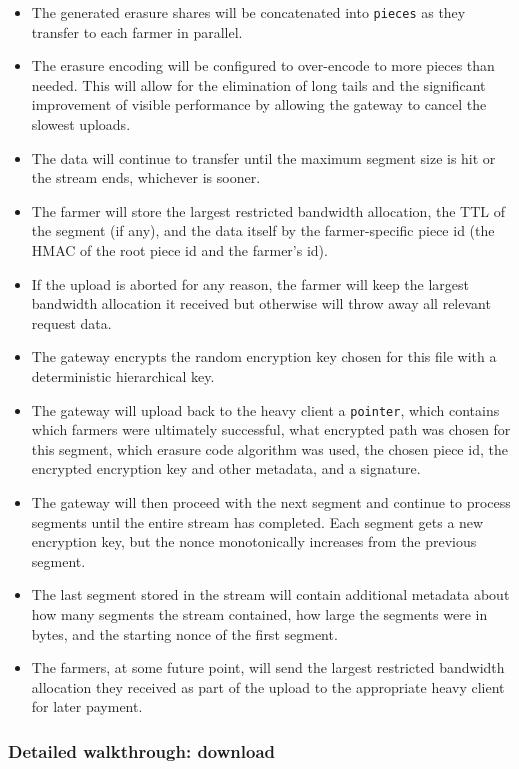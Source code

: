 \documentclass[a4paper,10pt]{article} \usepackage[utf8]{inputenc}
\newcommand{\x}[1]{{\tt #1}} \newcommand{\code}[1]{{\tt #1}}
\begin{document}
\begin{itemize}
\item The generated erasure shares will be concatenated into \x{pieces} as they
  transfer to each farmer in parallel.
\item The erasure encoding will be configured to over-encode to more pieces
  than needed. This will allow for the elimination of long tails and the
  significant improvement of visible performance by allowing the gateway to
  cancel the slowest uploads.
\item The data will continue to transfer until the maximum segment size is hit
  or the stream ends, whichever is sooner.
\item The farmer will store the largest restricted bandwidth allocation, the
  TTL of the segment (if any), and the data itself by the farmer-specific piece
  id (the HMAC of the root piece id and the farmer's id).
\item If the upload is aborted for any reason, the farmer will keep the
  largest bandwidth allocation it received but otherwise will throw away all
  relevant request data.
\item The gateway encrypts the random encryption key chosen for this file
  with a deterministic hierarchical key.
\item The gateway will upload back to the heavy client a \x{pointer}, which
  contains which farmers were
  ultimately successful, what encrypted path was chosen for this segment, which
  erasure code algorithm was used, the chosen piece id, the
  encrypted encryption key and other metadata, and a signature.
\item The gateway will then proceed with the next segment and continue to
  process segments until the entire stream has completed. Each segment gets
  a new encryption key, but the nonce monotonically increases from the previous
  segment.
\item The last segment stored in the stream will contain additional metadata
  about how many segments the stream contained, how large the segments were
  in bytes, and the starting nonce of the first segment.
\item The farmers, at some future point, will send the largest restricted
  bandwidth allocation they received as part of the upload to the appropriate
  heavy client for later payment.
\end{itemize}

\subsubsection{Detailed walkthrough: download}
\end{document}
